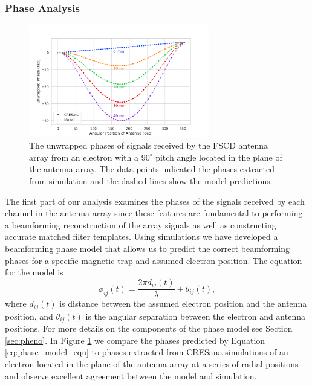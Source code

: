 \subsubsection{Phase Analysis}

\begin{figure}[htbp]
    \centering
    \includegraphics[width=0.7\textwidth]{figs/Chapter-5/230504_cresana_phases.png}
    \caption{The unwrapped phases of signals received by the FSCD antenna array from an electron with a $90^\circ$ pitch angle located in the plane of the antenna array. The data points indicated the phases extracted from simulation and the dashed lines show the model predictions. }
    \label{fig:cresana_simulated_phases}
\end{figure}

The first part of our analysis examines the phases of the signals received by each channel in the antenna array since these features are fundamental to performing a beamforming reconstruction of the array signals as well as constructing accurate matched filter templates. Using simulations we have developed a beamforming phase model that allows us to predict the correct beamforming phases for a specific magnetic trap and assumed electron position. The equation for the model is
\begin{equation}
    \phi_{ij}(t) = \frac{2\pi d_{ij}(t)}{\lambda} + \theta_{ij}(t),
    \label{eq:phase_model_eqn}
\end{equation}
where $d_{ij}(t)$ is distance between the assumed electron position and the antenna position, and $\theta_{ij}(t)$ is the angular separation between the electron and antenna positions. For more details on the components of the phase model see Section \ref{sec:pheno}. In Figure \ref{fig:cresana_simulated_phases} we compare the phases predicted by Equation \ref{eq:phase_model_eqn} to phases extracted from CRESana simulations of an electron located in the plane of the antenna array at a series of radial positions and observe excellent agreement between the model and simulation.

